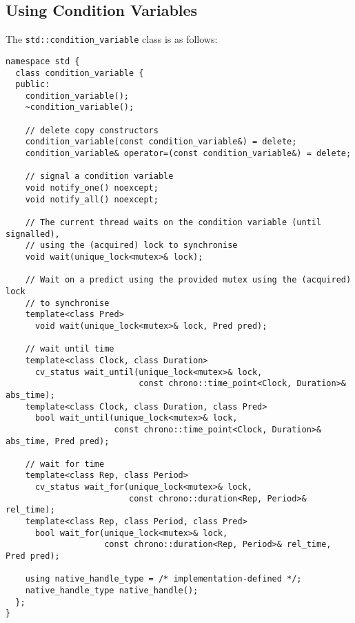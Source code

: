 \subsection{Using Condition Variables}
The \texttt{std::condition_variable} class is as follows:
\begin{verbatim}
namespace std {
  class condition_variable {
  public:
    condition_variable();
    ~condition_variable();
  
    // delete copy constructors
    condition_variable(const condition_variable&) = delete;
    condition_variable& operator=(const condition_variable&) = delete;

    // signal a condition variable
    void notify_one() noexcept;
    void notify_all() noexcept;

    // The current thread waits on the condition variable (until signalled), 
    // using the (acquired) lock to synchronise
    void wait(unique_lock<mutex>& lock);

    // Wait on a predict using the provided mutex using the (acquired) lock 
    // to synchronise
    template<class Pred>
      void wait(unique_lock<mutex>& lock, Pred pred);
    
    // wait until time
    template<class Clock, class Duration>
      cv_status wait_until(unique_lock<mutex>& lock,
                           const chrono::time_point<Clock, Duration>& abs_time);
    template<class Clock, class Duration, class Pred>
      bool wait_until(unique_lock<mutex>& lock,
                      const chrono::time_point<Clock, Duration>& abs_time, Pred pred);
    
    // wait for time
    template<class Rep, class Period>
      cv_status wait_for(unique_lock<mutex>& lock,
                         const chrono::duration<Rep, Period>& rel_time);
    template<class Rep, class Period, class Pred>
      bool wait_for(unique_lock<mutex>& lock,
                    const chrono::duration<Rep, Period>& rel_time, Pred pred);
 
    using native_handle_type = /* implementation-defined */;
    native_handle_type native_handle();
  };
}
\end{verbatim}
